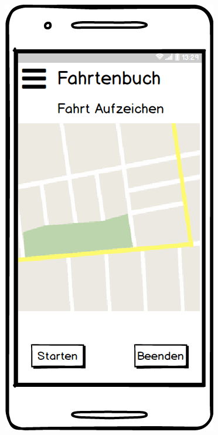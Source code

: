 \documentclass[a4paper]{article}
\begin{document}
\begin{figure}
\begin{minipage}[b]{0.3\textwidth}
    \end{minipage}
    \hspace{0.025\textwidth}%
	\begin{minipage}[b]{0.3\textwidth}
        \includegraphics[width=\textwidth]{img/mock5}

\end{minipage}
\end{figure}
\end{document}
